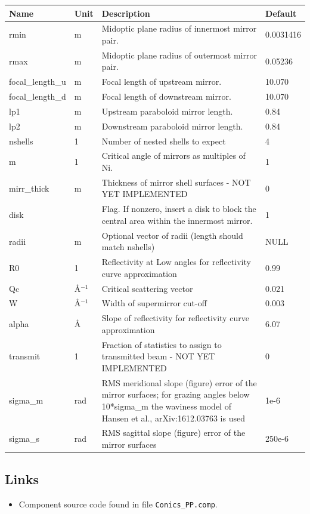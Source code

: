 \begin{longtable}{p{}p{}p{}p{}}
\toprule
\textbf{Name} & \textbf{Unit} & \textbf{Description} & \textbf{Default} \\
\midrule
\endhead
rmin & m & Midoptic plane radius of innermost mirror pair. & 0.0031416 \\
rmax & m & Midoptic plane radius of outermost mirror pair. & 0.05236 \\
focal\_length\_u & m & Focal length of upstream mirror. & 10.070 \\
focal\_length\_d & m & Focal length of downstream mirror. & 10.070 \\
lp1 & m & Upstream paraboloid mirror length. & 0.84 \\
lp2 & m & Downstream paraboloid mirror length. & 0.84 \\
nshells & 1 & Number of nested shells to expect & 4 \\
m & 1 & Critical angle of mirrors as multiples of Ni. & 1 \\
mirr\_thick & m & Thickness of mirror shell surfaces - NOT YET IMPLEMENTED & 0 \\
disk &   & Flag. If nonzero, insert a disk to block the central area within the innermost mirror. & 1 \\
radii & m & Optional vector of radii (length should match nshells) & NULL \\
R0 & 1 & Reflectivity at Low angles for reflectivity curve approximation & 0.99 \\
Qc & \AA{}$^{-1}$ & Critical scattering vector & 0.021 \\
W & \AA{}$^{-1}$ & Width of supermirror cut-off & 0.003 \\
alpha & \AA{} & Slope of reflectivity for reflectivity curve approximation & 6.07 \\
transmit & 1 & Fraction of statistics to assign to transmitted beam - NOT YET IMPLEMENTED & 0 \\
sigma\_m & rad & RMS meridional slope (figure) error of the mirror surfaces; for grazing angles below 10*sigma\_m the waviness model of Hansen et al., arXiv:1612.03763 is used & 1e-6 \\
sigma\_s & rad & RMS sagittal slope (figure) error of the mirror surfaces & 250e-6 \\
\bottomrule
\end{longtable}

\subsection*{Links}
\begin{itemize}
  \item Component source code found in file \texttt{Conics\_PP.comp}.
\end{itemize}
